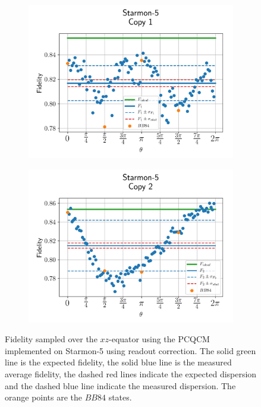\begin{figure}[H]
  \centering
  \begin{subfigure}{.5\textwidth}
    \centering
    \includegraphics[width=\textwidth]{Figures/PhaseCovariant/Starmon/OnlyEquator/results_starmon_corrected_copy1.png}
    \label{fig:pc_corrected_starmon_equator_1}
  \end{subfigure}%
  \begin{subfigure}{.5\textwidth}
    \centering
    \includegraphics[width=\textwidth]{Figures/PhaseCovariant/Starmon/OnlyEquator/results_starmon_corrected_copy2.png}
    \label{fig:pc_corrected_starmon_equator_2}
  \end{subfigure}
  \vspace{-0.5cm}
  \caption{Fidelity sampled over the $xz$-equator using the PCQCM implemented on Starmon-5 using readout correction.
  The solid green line is the expected fidelity, the solid blue line is the measured average fidelity, the dashed red lines indicate the expected dispersion and the dashed blue line indicate the measured dispersion. The orange points are the $BB84$ states.}
  \label{fig:pc_corrected_starmon_equator}
\end{figure}

